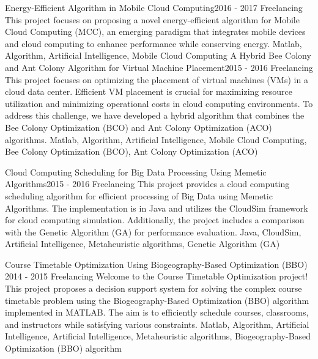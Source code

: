 \begin{projects}
	\project
	{Energy-Efficient Algorithm in Mobile Cloud Computing}{2016 - 2017}
	{ {Freelancing} }
	{This project focuses on proposing a novel energy-efficient algorithm for Mobile Cloud Computing (MCC), an emerging paradigm that integrates mobile devices and cloud computing to enhance performance while conserving energy.}
	{Matlab, Algorithm, Artificial Intelligence, Mobile Cloud Computing}
	\newpage
	\project
	{A Hybrid Bee Colony and Ant Colony Algorithm for Virtual Machine Placement}{2015 - 2016}
	{ {Freelancing} }
	{This project focuses on optimizing the placement of virtual machines (VMs) in a cloud data center. Efficient VM placement is crucial for maximizing resource utilization and minimizing operational costs in cloud computing environments. To address this challenge, we have developed a hybrid algorithm that combines the Bee Colony Optimization (BCO) and Ant Colony Optimization (ACO) algorithms.}
	{Matlab, Algorithm, Artificial Intelligence, Mobile Cloud Computing, Bee Colony Optimization (BCO), Ant Colony Optimization (ACO)}

	\project
	{Cloud Computing Scheduling for Big Data Processing Using Memetic Algorithms}{2015 - 2016}
	{ {Freelancing} }
	{This project provides a cloud computing scheduling algorithm for efficient processing of Big Data using Memetic Algorithms. The implementation is in Java and utilizes the CloudSim framework for cloud computing simulation. Additionally, the project includes a comparison with the Genetic Algorithm (GA) for performance evaluation.}
	{Java, CloudSim, Artificial Intelligence, Metaheuristic algorithms, Genetic Algorithm (GA)}

	\project
	{Course Timetable Optimization Using Biogeography-Based Optimization (BBO) }{2014 - 2015}
	{ {Freelancing} }
	{Welcome to the Course Timetable Optimization project! This project proposes a decision support system for solving the complex course timetable problem using the Biogeography-Based Optimization (BBO) algorithm implemented in MATLAB. The aim is to efficiently schedule courses, classrooms, and instructors while satisfying various constraints.}
	{Matlab, Algorithm, Artificial Intelligence, Artificial Intelligence, Metaheuristic algorithms, Biogeography-Based Optimization (BBO) algorithm}

\end{projects}